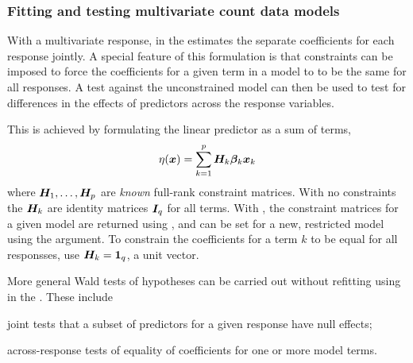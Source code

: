 \documentclass[11pt]{book}\usepackage[]{graphicx}\usepackage[]{color}
\begin{document}
\subsubsection{Fitting and testing multivariate count data models}

With a multivariate response,  in the  estimates the separate
coefficients for each response jointly.  A special feature of this formulation is that 
constraints can be imposed to force the coefficients for a given term in a model to
to be the same for all responses.  A \LR test against the unconstrained model can then
be used to test for differences in the effects of predictors across the response variables.

This is achieved by formulating the linear predictor as a sum of terms,
\begin{equation*}
\eta (\bm{x}) = \sum_{k=1}^p  \bm{H}_k  \bm{\beta}_k \bm{x}_k 
\end{equation*}
where $\bm{H}_1, \dots , \bm{H}_p$ are \emph{known} full-rank constraint matrices.
With no constraints the $\bm{H}_k$ are identity matrices $\bm{I}_q$ for all terms.
With , the constraint matrices for a given model are returned using
, and can be set for a new, restricted model using the 
argument. To constrain the coefficients for a term $k$ to be equal for all responsses,
use $\bm{H}_k = \bm{1}_q$, a unit vector.

More general Wald tests of hypotheses can be carried out without refitting using 
in the .  These include
\begin{seriate}
  \item joint tests that a subset of predictors for a given response have null effects;
  \item across-response tests of equality of coefficients for one or more model terms.
\end{seriate}
\end{document}

